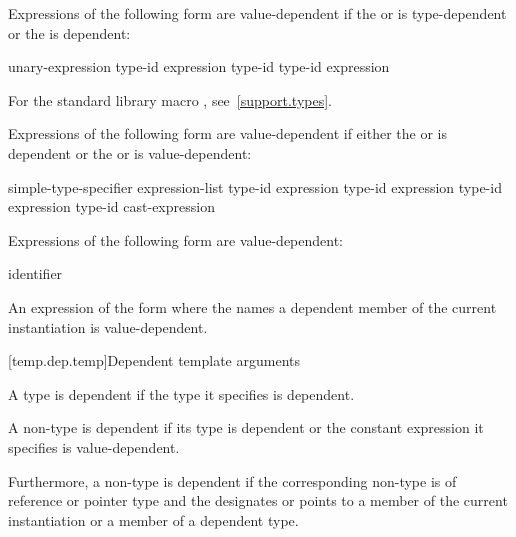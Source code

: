 Expressions of the following form are value-dependent if the
 or 
is type-dependent or the
is dependent:

\begin{ncbnftab}
 unary-expression\br
{} type-id \terminal{)}\br
{} expression \terminal{)}\br
{} type-id \terminal{)}\br
{} type-id \terminal{)}\br
{} \terminal{(} expression \terminal{)}
\end{ncbnftab}

\enternote For the standard library macro ,
see~\ref{support.types}.\exitnote

\pnum
Expressions of the following form are value-dependent if either the
or
is dependent or the
or
is value-dependent:

\begin{ncbnftab}
simple-type-specifier \terminal{(} expression-list\opt \terminal{)}\br
{} type-id \terminal{> (} expression \terminal{)}\br
{} type-id \terminal{> (} expression \terminal{)}\br
{} type-id \terminal{> (} expression \terminal{)}\br
\terminal{(} type-id \terminal{)} cast-expression
\end{ncbnftab}

\pnum
Expressions of the following form are value-dependent:

\begin{ncbnftab}
  \terminal{(} identifier \terminal{)}
\end{ncbnftab}

\pnum
An expression of the form \tcode{\&} where the
 names a dependent member of the current
instantiation is value-dependent.

[temp.dep.temp]{Dependent template arguments}

\pnum
A type
is dependent if the type it specifies is dependent.

\pnum
A non-type
is dependent if its type is dependent or the constant
expression it specifies is value-dependent.

\pnum
Furthermore, a non-type
is dependent if the corresponding non-type 
is of reference or pointer type and the 
designates or points to a member of the current instantiation or a member of
a dependent type.

